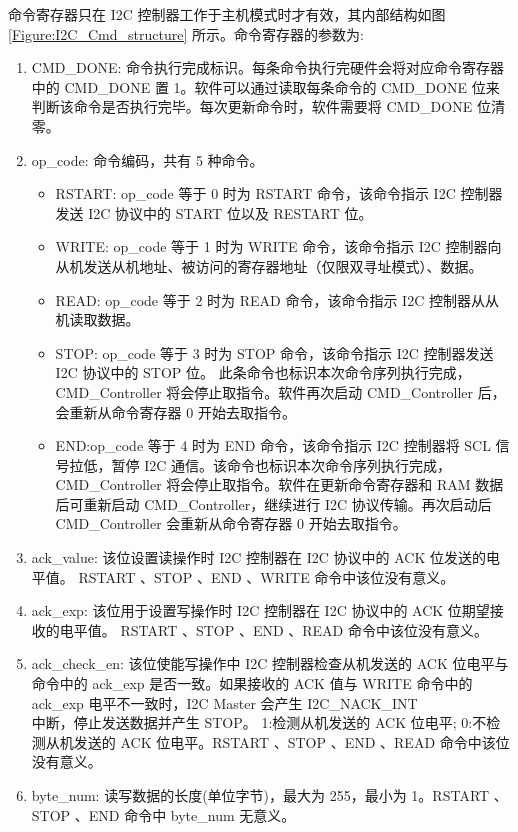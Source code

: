 \documentclass[main\_\_CN.tex]{subfiles}
\begin{document}
命令寄存器只在 I2C 控制器工作于主机模式时才有效，其内部结构如图 \ref{Figure:I2C_Cmd_structure} 所示。命令寄存器的参数为:

\begin{enumerate}

\item CMD\_DONE: 命令执行完成标识。每条命令执行完硬件会将对应命令寄存器中的 CMD\_DONE 置 1。软件可以通过读取每条命令的 CMD\_DONE 位来判断该命令是否执行完毕。每次更新命令时，软件需要将 CMD\_DONE 位清零。

\item op\_code: 命令编码，共有 5 种命令。

\begin{itemize}
    \item RSTART: op\_code 等于 0 时为 RSTART 命令，该命令指示 I2C 控制器发送 I2C 协议中的 START 位以及 RESTART 位。

    \item WRITE: op\_code 等于 1 时为 WRITE 命令，该命令指示 I2C 控制器向从机发送从机地址、被访问的寄存器地址（仅限双寻址模式）、数据。

    \item READ: op\_code 等于 2 时为 READ 命令，该命令指示 I2C 控制器从从机读取数据。

    \item STOP: op\_code 等于 3 时为 STOP 命令，该命令指示 I2C 控制器发送 I2C 协议中的 STOP 位。 此条命令也标识本次命令序列执行完成，CMD\_Controller 将会停止取指令。软件再次启动 CMD\_Controller 后， 会重新从命令寄存器 0 开始去取指令。

    \item END:op\_code 等于 4 时为 END 命令，该命令指示 I2C 控制器将 SCL 信号拉低，暂停 I2C 通信。该命令也标识本次命令序列执行完成，CMD\_Controller 将会停止取指令。软件在更新命令寄存器和 RAM 数据后可重新启动 CMD\_Controller，继续进行 I2C 协议传输。再次启动后 CMD\_Controller 会重新从命令寄存器 0 开始去取指令。

\end{itemize}

\item ack\_value: 该位设置读操作时 I2C 控制器在 I2C 协议中的 ACK 位发送的电平值。 RSTART 、STOP 、END 、WRITE 命令中该位没有意义。

\item ack\_exp: 该位用于设置写操作时 I2C 控制器在 I2C 协议中的 ACK 位期望接收的电平值。 RSTART 、STOP 、END 、READ 命令中该位没有意义。

\item ack\_check\_en: 该位使能写操作中 I2C 控制器检查从机发送的 ACK 位电平与命令中的 ack\_exp 是否一致。如果接收的 ACK 值与 WRITE 命令中的 ack\_exp 电平不一致时，I2C Master 会产生 I2C\_NACK\_INT\\ 中断，停止发送数据并产生 STOP。 1:检测从机发送的 ACK 位电平; 0:不检测从机发送的 ACK 位电平。RSTART 、STOP 、END 、READ 命令中该位没有意义。

\item byte\_num: 读写数据的长度(单位字节)，最大为 255，最小为 1。RSTART 、STOP 、END 命令中 byte\_num 无意义。

\end{enumerate}
\end{document}
